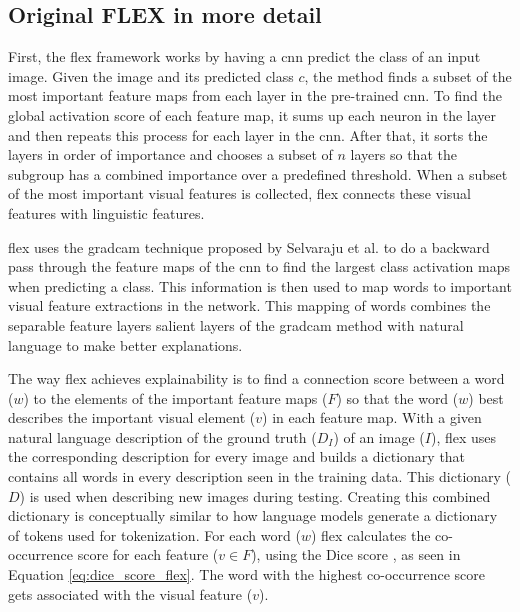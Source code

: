         \subsection{Original FLEX in more detail}
        \label{sec3:flex_detailed}
        First, the \gls{flex} framework works by having a \gls{cnn} predict the class of an input image. Given the image and its predicted class $c$, the method finds a subset of the most important feature maps from each layer in the pre-trained \gls{cnn}. To find the global activation score of each feature map, it sums up each neuron in the layer and then repeats this process for each layer in the \gls{cnn}. After that, it sorts the layers in order of importance and chooses a subset of $n$ layers so that the subgroup has a combined importance over a predefined threshold. When a subset of the most important visual features is collected, \gls{flex} connects these visual features with linguistic features. 

        \gls{flex} uses the \gls{gradcam} technique proposed by Selvaraju et al. \cite{selvarajuGradCAMVisualExplanations2020} to do a backward pass through the feature maps of the \gls{cnn} to find the largest class activation maps when predicting a class. This information is then used to map words to important visual feature extractions in the network. This mapping of words combines the separable feature layers salient layers of the \gls{gradcam} method with natural language to make better explanations.
        
        The way \gls{flex} achieves explainability is to find a connection score between a word ($w$) to the elements of the important feature maps ($F$) so that the word ($w$) best describes the important visual element ($v$) in each feature map. With a given natural language description of the ground truth ($D_I$) of an image ($I$), \gls{flex} uses the corresponding description for every image and builds a dictionary that contains all words in every description seen in the training data. This dictionary ($D$) is used when describing new images during testing. 
        Creating this combined dictionary is conceptually similar to how language models generate a dictionary of tokens used for tokenization.
        For each word ($w$) \gls{flex} calculates the co-occurrence score for each feature ($v \in F$), using the Dice score \cite{diceMeasuresAmountEcologic1945, sorensenMethodEstablishingGroups1948}, as seen in Equation \ref{eq:dice_score_flex}. The word with the highest co-occurrence score gets associated with the visual feature ($v$). 
        
